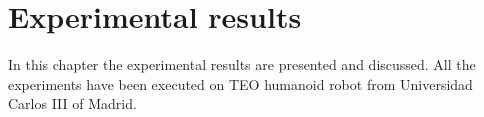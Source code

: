 \chapter{Experimental results}
In this chapter the experimental results are presented and discussed. All the experiments have been executed on TEO humanoid robot from Universidad Carlos III of Madrid.

%
